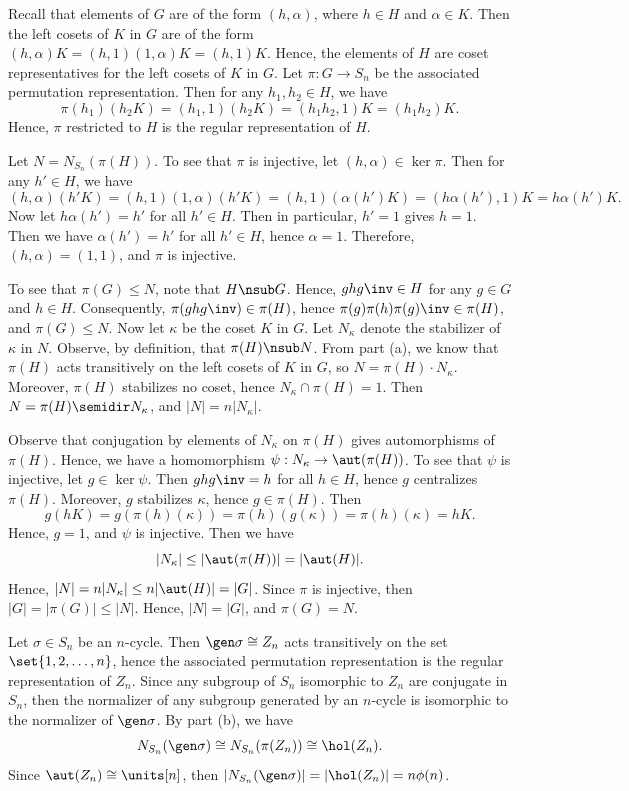 \begin{solalph}
    \item Recall that elements of $G$ are of the form $(h, \alpha)$, where $h \in H$ and $\alpha \in K$. Then the left cosets of $K$ in $G$ are of the form $(h, \alpha)K = (h, 1)(1, \alpha)K = (h, 1)K$. Hence, the elements of $H$ are coset representatives for the left cosets of $K$ in $G$. Let $\pi : G \to S_n$ be the associated permutation representation. Then for any $h_1, h_2 \in H$, we have
    \[\pi(h_1)(h_2K) = (h_1, 1)(h_2K) = (h_1h_2, 1)K = (h_1h_2)K.\]
    Hence, $\pi$ restricted to $H$ is the regular representation of $H$.
    \item Let $N = N_{S_n}(\pi(H))$. To see that $\pi$ is injective, let $(h, \alpha) \in \ker\pi$. Then for any $h' \in H$, we have
    \[(h, \alpha)(h'K) = (h, 1)(1, \alpha)(h'K) = (h, 1)(\alpha(h')K) = (h\alpha(h'), 1)K = h\alpha(h')K.\]
    Now let $h\alpha(h') = h'$ for all $h' \in H$. Then in particular, $h' = 1$ gives $h = 1$. Then we have $\alpha(h') = h'$ for all $h' \in H$, hence $\alpha = 1$. Therefore, $(h, \alpha) = (1, 1)$, and $\pi$ is injective.

    To see that $\pi(G) \leq N$, note that $H \nsub G$. Hence, $ghg\inv \in H$ for any $g \in G$ and $h \in H$. Consequently, $\pi(ghg\inv) \in \pi(H)$, hence $\pi(g)\pi(h)\pi(g)\inv \in \pi(H)$, and $\pi(G) \leq N$. Now let $\kappa$ be the coset $K$ in $G$. Let $N_\kappa$ denote the stabilizer of $\kappa$ in $N$. Observe, by definition, that $\pi(H) \nsub N$. From part (a), we know that $\pi(H)$ acts transitively on the left cosets of $K$ in $G$, so $N = \pi(H) \cdot N_\kappa$. Moreover, $\pi(H)$ stabilizes no coset, hence $N_\kappa \cap \pi(H) = 1$. Then $N = \pi(H) \semidir N_\kappa$, and $|N| = n|N_\kappa|$.

    Observe that conjugation by elements of $N_\kappa$ on $\pi(H)$ gives automorphisms of $\pi(H)$. Hence, we have a homomorphism $\psi : N_\kappa \to \aut(\pi(H))$. To see that $\psi$ is injective, let $g \in \ker\psi$. Then $ghg\inv = h$ for all $h \in H$, hence $g$ centralizes $\pi(H)$. Moreover, $g$ stabilizes $\kappa$, hence $g \in \pi(H)$. Then
    \[g(hK) = g(\pi(h)(\kappa)) = \pi(h)(g(\kappa)) = \pi(h)(\kappa) = hK.\]
    Hence, $g = 1$, and $\psi$ is injective. Then we have
    \[|N_\kappa| \leq |\aut(\pi(H))| = |\aut(H)|.\]
    Hence, $|N| = n|N_\kappa| \leq n|\aut(H)| = |G|$. Since $\pi$ is injective, then $|G| = |\pi(G)| \leq |N|$. Hence, $|N| = |G|$, and $\pi(G) = N$.
    \item Let $\sigma \in S_n$ be an $n$-cycle. Then $\gen\sigma \cong Z_n$ acts transitively on the set $\set{1, 2, \ldots, n}$, hence the associated permutation representation is the regular representation of $Z_n$. Since any subgroup of $S_n$ isomorphic to $Z_n$ are conjugate in $S_n$, then the normalizer of any subgroup generated by an $n$-cycle is isomorphic to the normalizer of $\gen\sigma$. By part (b), we have
    \[N_{S_n}(\gen\sigma) \cong N_{S_n}(\pi(Z_n)) \cong \hol(Z_n).\]
    Since $\aut(Z_n) \cong \units[n]$, then $|N_{S_n}(\gen\sigma)| = |\hol(Z_n)| = n\phi(n)$.
\end{solalph}

